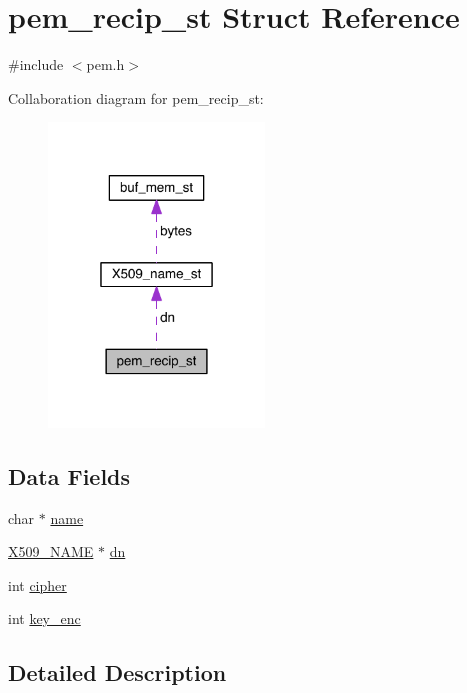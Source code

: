 \hypertarget{structpem__recip__st}{}\section{pem\+\_\+recip\+\_\+st Struct Reference}
\label{structpem__recip__st}


{\ttfamily \#include $<$pem.\+h$>$}



Collaboration diagram for pem\+\_\+recip\+\_\+st\+:\nopagebreak
\begin{figure}[H]
\begin{center}
\leavevmode
\includegraphics[width=163pt]{structpem__recip__st__coll__graph}
\end{center}
\end{figure}
\subsection*{Data Fields}
\begin{DoxyCompactItemize}
\item 
char $\ast$ \hyperlink{structpem__recip__st_ad547fb8186b526cb1b588daad4334fbe}{name}
\item 
\hyperlink{crypto_2ossl__typ_8h_a5c5fc036757e87b9bd163d0221696533}{X509\+\_\+\+N\+A\+ME} $\ast$ \hyperlink{structpem__recip__st_a5d643db297d66b994cafc94d6a2f37bb}{dn}
\item 
int \hyperlink{structpem__recip__st_aa66cc9b6b16f917a5c9f7597cf6e427a}{cipher}
\item 
int \hyperlink{structpem__recip__st_a721ddcfd0092c7f0f4b6bd1289e37174}{key\+\_\+enc}
\end{DoxyCompactItemize}


\subsection{Detailed Description}


